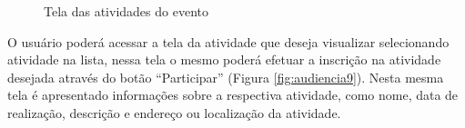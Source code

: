 \begin{figure}[H]
    \centering
    \caption{Tela das atividades do evento}
    \label{fig:audiencia8}
\end{figure}

O usuário poderá acessar a tela da atividade que deseja visualizar selecionando atividade na lista, nessa tela o mesmo poderá efetuar a inscrição na atividade desejada através do botão “Participar” (Figura \ref{fig:audiencia9}). Nesta mesma tela é apresentado informações sobre a respectiva atividade, como nome, data de realização, descrição e endereço ou localização da atividade.

